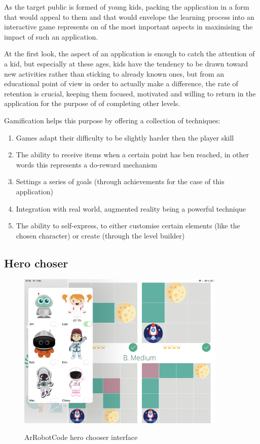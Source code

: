 \documentclass[12 pct]{report}
\begin{document}
As the target public is formed of young kids, packing the application in a form that would appeal to them and that would envelope the learning process into an interactive game represents on of the most important aspects in maximising the impact of such an application. 

At the first look, the aspect of an application is enough to catch the attention of a kid, but especially at these ages, kids have the tendency to be drawn toward new activities rather than sticking to already known ones, but from an educational point of view in order to actually make a difference, the rate of retention is crucial, keeping them focused, motivated and willing to return in the application for the purpose of of completing other levels.


Gamification helps this purpose by offering a collection of techniques:

\begin{enumerate}
\item Games adapt their difficulty to be slightly harder then the player skill
\item The ability to receive items when a certain point has ben reached, in other words this represents a do-reward mechanism
\item Settings a series of goals (through achievements for the case of this application)
\item Integration with real world, augmented reality being a powerful technique
\item The ability to self-express, to either customise certain elements (like the chosen character) or create (through the level builder)
\end{enumerate}
\subsection*{Hero choser}
\begin{figure}[H]
\includegraphics[width=0.89\textwidth]{ArRobotCode1}
\centering
\label{fig:feature-points}
\caption{ArRobotCode hero chooser interface}
\end{figure}
\end{document}
